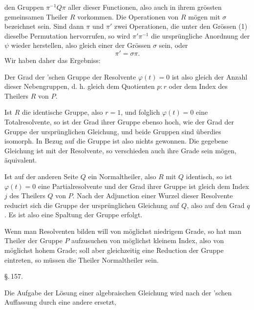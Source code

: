den Gruppen $\pi^{-1}Q\pi$ aller dieser Functionen, also auch in ihrem
gr\"ossten gemeinsamen Theiler $R$ vorkommen. Die Operationen
von $R$ m\"ogen mit $\sigma$ bezeichnet sein. Sind dann $\pi$ und $\pi'$ zwei
Operationen, die unter den Gr\"ossen (1) dieselbe Permutation
hervorrufen, so wird $\pi'\pi^{-1}$ die urspr\"ungliche Anordnung der $\psi$
wieder herstellen, also gleich einer der Gr\"ossen $\sigma$ sein, oder
\[ \pi' = \sigma\pi. \]
Wir haben daher das Ergebniss:

\begin{quote}
\end{quote}

Der Grad der 'schen Gruppe der Resolvente $\varphi(t) = 0$
ist also gleich der Anzahl dieser Nebengruppen, d. h. gleich dem
Quotienten $p : r$ oder dem Index des Theilers $R$ von $P$.

Ist $R$ die identische Gruppe, also $r = 1$, und folglich $\varphi(t) = 0$
eine Totalresolvente, so ist der Grad ihrer Gruppe ebenso hoch,
wie der Grad der Gruppe der urspr\"unglichen Gleichung, und beide
Gruppen sind \"uberdies isomorph. In Bezug auf die Gruppe ist
also nichts gewonnen. Die gegebene Gleichung ist mit der
Resolvente, so verschieden auch ihre Grade sein m\"ogen, \"aquivalent.

Ist auf der anderen Seite $Q$ ein Normaltheiler, also $R$ mit $Q$
identisch, so ist $\varphi(t) = 0$ eine Partialresolvente und der Grad
ihrer Gruppe ist gleich dem Index $j$ des Theilers $Q$ von $P$.
Nach der Adjunction einer Wurzel dieser Resolvente reducirt
sich die Gruppe der urspr\"unglichen Gleichung auf $Q$, also auf
den Grad $q$. Es ist also eine Spaltung der Gruppe erfolgt.

Wenn man Resolventen bilden will von m\"oglichst niedrigem
Grade, so hat man Theiler der Gruppe $P$ aufzusuchen von m\"oglichst kleinem Index, also von m\"oglichst hohem Grade; soll aber
gleichzeitig eine Reduction der Gruppe eintreten, so m\"ussen die
Theiler Normaltheiler sein.

\begin{center}
\S.\,157.

\end{center}

Die Aufgabe der L\"osung einer algebraischen Gleichung wird
nach der 'schen Auffassung durch eine andere ersetzt,
